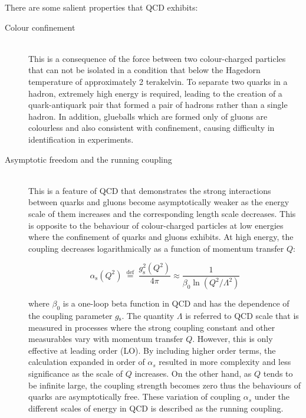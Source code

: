 \documentclass[UTF8,12pt]{ctexart}
\numberwithin{equation}{section}
\begin{document}
There are some salient properties that QCD exhibits:
\begin{description}
\item[Colour confinement] \mbox{} \\
	This is a consequence of the force between two colour-charged particles that can not be isolated in a condition that below the Hagedorn temperature of approximately 2 terakelvin. To separate two quarks in a hadron, extremely high energy is required, leading to the creation of a quark-antiquark pair that formed a pair of hadrons rather than a single hadron. In addition, glueballs which are formed only of gluons are colourless and also consistent with confinement, causing difficulty in identification in experiments. 
	
	
	

\item[Asymptotic freedom and the running coupling] \mbox{} \\
	This is a feature of QCD that demonstrates the strong interactions between quarks and gluons become asymptotically weaker as the energy scale of them increases and the corresponding length scale decreases. This is opposite to the behaviour of colour-charged particles at low energies where the confinement of quarks and gluons exhibits. At high energy, the coupling decreases logarithmically as a function of momentum transfer $Q$:

		\begin{equation}
		\alpha_{\mathrm{s}}\left(Q^{2}\right) \stackrel{\text { def }}{=} \frac{g_{\mathrm{s}}^{2}\left(Q^{2}\right)}{4 \pi} \approx \frac{1}{\beta_{0} \ln \left(Q^{2} / \Lambda^{2}\right)}
		\end{equation}
		
where $\beta_{0}$ is a one-loop beta function in QCD and has the dependence of the coupling parameter $g$$_\mathrm{s}$. The quantity $\Lambda$ is referred to QCD scale that is measured in processes where the strong coupling constant and other measurables vary with momentum transfer $Q$.
However, this is only effective at leading order (LO). By including higher order terms, the calculation expanded in order of $\alpha_{s}$ resulted in more complexity and less significance as the scale of $Q$ increases. On the other hand, as $Q$ tends to be infinite large, the coupling strength becomes zero thus the behaviours of quarks are asymptotically free. These variation of coupling $\alpha_{s}$ under the different scales of energy in QCD is described as the running coupling.



	
\end{description}
\end{document}
